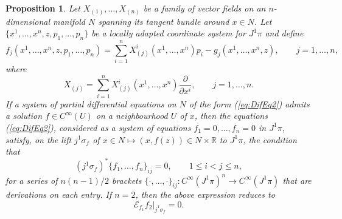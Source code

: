 \documentclass[12pt]{article}
\theoremstyle{plain}
\newtheorem{proposition}[theorem]{Proposition}
\theoremstyle{definition}
\numberwithin{equation}{section}
\begin{document}
\begin{proposition}\label{Prop:NewMethod} Let $X_{(1)},\ldots,X_{(n)}$ be a family of vector fields on an $n$-dimensional manifold $N$ spanning its tangent bundle around $x\in N$. Let $\{x^1,\ldots,x^n,z,p_1,\ldots, p_n\}$ be a locally adapted coordinate system for $J^1\pi$ and define 
\begin{equation}\label{Def:fun2}
f_j(x^1,\ldots,x^n,z,p_1,\ldots,p_n)=\sum_{i=1}^nX_{(j)}^i(x^1,\ldots,x^n)p_i-g_j(x^1,\ldots,x^n,z),\qquad j=1,\ldots,n,
\end{equation}
where 
$$
X_{(j)}=\sum_{i=1}^nX_{(j)}^i(x^1,\ldots,x^n)\frac{\partial}{\partial x^i},\qquad j=1,\ldots,n.
$$
If a system of partial differential equations on $N$ of the form
(\ref{eq:DifEq2}) admits a solution $f\in C^\infty(U)$ on a neighbourhood $U$ of $x$, then the equations (\ref{eq:DifEq2}), considered as a system of  equations $f_1=0,\ldots,f_n=0$ in $J^1\pi$, satisfy, on the lift $j^1\sigma_f$ of  $x\in N\mapsto (x,f(z))\in N\times \mathbb{R}$ to $J^1\pi$, the condition that
$$
(j^1\sigma_f)^*\{f_1,\ldots,f_n\}_{ij}=0, \qquad 1\leq i<j\leq n,
$$
for a series of $n(n-1)/2$ brackets $\{\cdot,\ldots,\cdot\}_{ij}:C^\infty(J^1\pi)^n\rightarrow C^\infty(J^1\pi)$ that are derivations on each entry. If $n=2$, then the above expression reduces to
\begin{equation}\label{eq:SnCh}
\mathcal{E}_{f_1}f_2|_{j^1\sigma_f}=0.
\end{equation}
\end{proposition}
\end{document}
